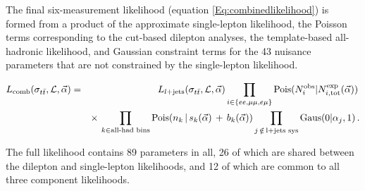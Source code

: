 The final six-measurement likelihood (equation \ref{Eq:combinedlikelihood}) is formed from a product of the approximate single-lepton likelihood, the Poisson terms corresponding to the cut-based dilepton analyses, the template-based all-hadronic likelihood, and Gaussian constraint terms for the 43 nuisance parameters that are not constrained by the single-lepton likelihood.


\begin{eqnarray} \label{Eq:combinedlikelihood} \nonumber
  L_{\text{comb}}(\sigma_{t\bar{t}}, {\cal L}, \vec{\alpha}) &=& L_{l+\rm jets}(\sigma_{t\bar{t}},{\cal L}, \vec{\alpha})  \prod_{i\in \{ ee,\mu\mu,e\mu\} } 
   \text{Pois}(N^{\text{obs}}_i | N^{\text{exp}}_{i, \text{tot}}(\vec{\alpha}) ) \, \\ \nonumber 
   & & \times \,  \prod_{k\in \text{all-had bins}} \text{Pois}(n_{k} \,|\, s_{k}(\vec{\alpha}) \,+\, b_{k}(\vec{\alpha})) 
     \prod_{j \, \notin \, \text{l+jets sys} } \text{Gaus}( 0 | \alpha_{j}, 1) \, . \\
\end{eqnarray}


The full likelihood contains 89 parameters in all, 26 of which are shared between the dilepton and single-lepton likelihoods, and 12 of which are common to all three component likelihoods.



